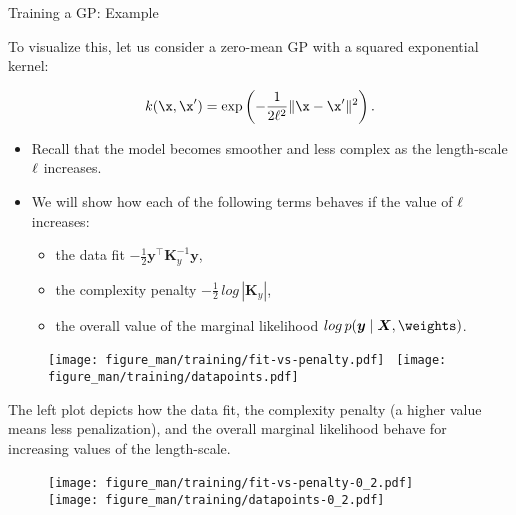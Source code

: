 \begin{frame}[c,allowframebreaks]{Training a GP: Example}

To visualize this, let us consider a zero-mean GP with a squared exponential kernel:

$$
k(\x, \x^\prime) = \exp\left(-\frac{1}{2\ls^2}\|\x - \x^\prime\|^2\right).
$$


\begin{itemize}
	\item Recall that the model becomes smoother and less complex as the length-scale $\ell$ increases.
	\lz
	\item We will show how each of the following terms behaves if the value of $\ell$ increases:
	\vspace{2mm}
	\begin{itemize}
		\item the data fit $-\frac{1}{2}\bm{y}^\top\bm{K}_y^{-1} \bm{y}$,
		\vspace{2mm}
		\item the complexity penalty $-\frac{1}{2}\,log\,\left| \bm{K}_y \right|$,
		\vspace{2mm}
		\item the overall value of the marginal likelihood $log\,p(\bm{y}\mid\bm{X}, \thetab)$.
	\end{itemize}
\end{itemize}



\framebreak

\begin{figure}
	\texttt{[image: figure\_man/training/fit-vs-penalty.pdf]}~	\texttt{[image: figure\_man/training/datapoints.pdf]}
\end{figure}

\begin{footnotesize}
\textcolor{blue}{\faInfoCircle} The left plot depicts how the data fit, the complexity penalty (a higher value means less penalization), and the overall marginal likelihood behave for increasing values of the length-scale.
\end{footnotesize}


\framebreak


\begin{figure}
	\texttt{[image: figure\_man/training/fit-vs-penalty-0\_2.pdf]}~	\texttt{[image: figure\_man/training/datapoints-0\_2.pdf]}
\end{figure}



\end{frame}
